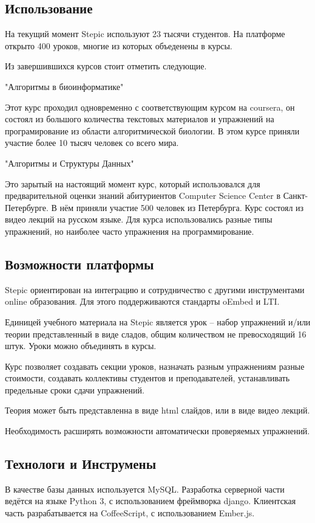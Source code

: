 \documentclass{matmex-diploma-custom}
\begin{document}
\subsection*{Использование}
На текущий момент Stepic используют 23 тысячи студентов. На платформе
открыто 400 уроков, многие из которых объеденены в курсы.

Из завершившихся курсов стоит отметить следующие.

"Алгоритмы в биоинформатике"

Этот курс проходил одновременно с соответствующим курсом на coursera,
он состоял из большого количества текстовых материалов и упражнений на
програмирование из области алгоритмической биологии. В этом курсе
приняли участие более 10 тысяч человек со всего мира.

"Алгоритмы и Структуры Данных"

Это зарытый на настоящий момент курс, который использовался для
предварительной оценки знаний абитуриентов Computer Science Center в
Санкт-Петербурге. В нём приняли участие 500 человек из
Петербурга. Курс состоял из видео лекций на русском языке. Для курса
использовались разные типы упражнений, но наиболее часто упражнения на
программирование.

\subsection*{Возможности платформы}
Stepic ориентирован на интеграцию и сотрудничество с другими инструментами
online образования. Для этого поддерживаются стандарты oEmbed и LTI.

Единицей учебного материала на Stepic является урок -- набор упражнений
и/или теории представленный в виде сладов, общим количеством не
превосходящий 16 штук. Уроки можно объединять в курсы.

Курс позволяет создавать секции уроков, назначать разным упражнениям
разные стоимости, создавать коллективы студентов и преподавателей,
устанавливать предельные сроки сдачи упражнений.

Теория может быть представленна в виде html слайдов, или в виде видео
лекций.

Необходимость расширять возможности автоматически проверяемых упражнений.

\subsection*{Технологи и Инструмены}
В качестве базы данных используется MySQL. Разработка серверной части
ведётся на языке Python 3, с использованием фреймворка
django. Клиентская часть разрабатывается на CoffeeScript, с
использованием Ember.js.
\end{document}
